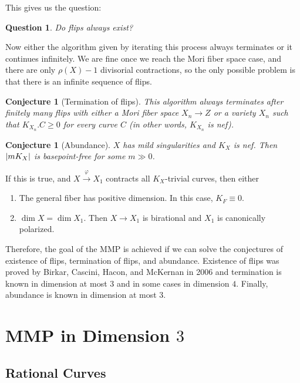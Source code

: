 \documentclass[leqno, openany]{memoir}
\newtheorem{conj}[thm]{Conjecture}
\newtheorem{quest}[thm]{Question}
\theoremstyle{definition}
\theoremstyle{remark}
\theoremstyle{plain}
\theoremstyle{definition}
\theoremstyle{remark}
\begin{document}
This gives us the question:
\begin{quest}
    Do flips always exist?
\end{quest}
Now either the algorithm given by iterating this process always terminates or it continues infinitely. We are fine once we reach the Mori fiber space case, and there are only $\rho(X) - 1$ divisorial contractions, so the only possible problem is that there is an infinite sequence of flips.

\begin{conj}[Termination of flips]
    This algorithm always terminates after finitely many flips with either a Mori fiber space $X_n \to Z$ or a variety $X_n$ such that $K_{X_n}.C \geq 0$ for every curve $C$ (in other words, $K_{X_n}$ is nef).
\end{conj}

\begin{conj}[Abundance]
    $X$ has mild singularities and $K_X$ is nef. Then $\abs{m K_X}$ is basepoint-free for some $m \gg 0$.
\end{conj}

If this is true, and $X \xrightarrow{\varphi} X_1$ contracts all $K_X$-trivial curves, then either
\begin{enumerate}
    \item The general fiber has positive dimension. In this case, $K_F \equiv 0$.
    \item $\dim X = \dim X_1$. Then $X \to X_1$ is birational and $X_1$ is canonically polarized.
\end{enumerate}

Therefore, the goal of the MMP is achieved if we can solve the conjectures of existence of flips, termination of flips, and abundance. Existence of flips was proved by Birkar, Cascini, Hacon, and McKernan in 2006 and termination is known in dimension at most $3$ and in some cases in dimension $4$. Finally, abundance is known in dimension at most $3$.

\chapter{MMP in Dimension $3$}%
\label{cha:mmp_in_dimension_3_}

\section{Rational Curves}%
\label{sec:bend_and_break}
\end{document}
